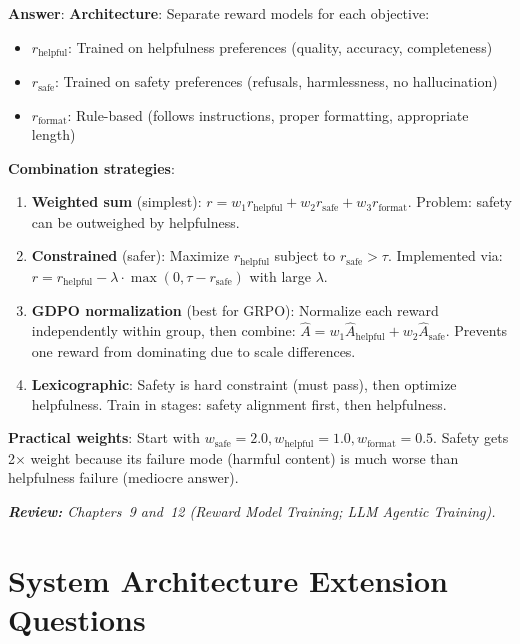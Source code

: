 \begin{questionbox}
\textbf{Answer}: \textbf{Architecture}: Separate reward models for each objective:

\begin{itemize}
  \item $r_\text{helpful}$: Trained on helpfulness preferences (quality, accuracy, completeness)
  \item $r_\text{safe}$: Trained on safety preferences (refusals, harmlessness, no hallucination)
  \item $r_\text{format}$: Rule-based (follows instructions, proper formatting, appropriate length)
\end{itemize}

\textbf{Combination strategies}:

\begin{enumerate}
  \item \textbf{Weighted sum} (simplest): $r = w_1 r_\text{helpful} + w_2 r_\text{safe} + w_3 r_\text{format}$. Problem: safety can be outweighed by helpfulness.
  \item \textbf{Constrained} (safer): Maximize $r_\text{helpful}$ subject to $r_\text{safe} > \tau$. Implemented via: $r = r_\text{helpful} - \lambda \cdot \max(0, \tau - r_\text{safe})$ with large $\lambda$.
  \item \textbf{GDPO normalization} (best for GRPO): Normalize each reward independently within group, then combine: $\hat{A} = w_1 \hat{A}_\text{helpful} + w_2 \hat{A}_\text{safe}$. Prevents one reward from dominating due to scale differences.
  \item \textbf{Lexicographic}: Safety is hard constraint (must pass), then optimize helpfulness. Train in stages: safety alignment first, then helpfulness.
\end{enumerate}

\textbf{Practical weights}: Start with $w_\text{safe}=2.0, w_\text{helpful}=1.0, w_\text{format}=0.5$. Safety gets 2$\times$ weight because its failure mode (harmful content) is much worse than helpfulness failure (mediocre answer).

\emph{\textbf{Review:} Chapters~9 and~12 (Reward Model Training; LLM Agentic Training).}
\end{questionbox}

\section{System Architecture Extension Questions}
\label{system-architecture-extension-questions}

